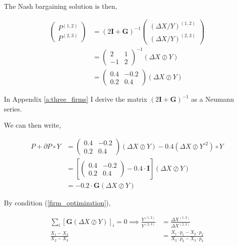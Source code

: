 \documentclass[american]{scrartcl}
\newcommand{\matr}[1]{\bm{#1}}
\begin{document}
The Nash bargaining solution is then,

\begin{equation*}
	\begin{split}
		\begin{pmatrix}
			P^{(1, 2)} \\
			P^{(2, 3)}
		\end{pmatrix} &= (2\matr{I} + \matr{G})^{-1} \begin{pmatrix}
			(\Delta X / Y)^{(1, 2)} \\
			(\Delta X / Y)^{(2, 3)}
		\end{pmatrix} \\
		&= \begin{pmatrix}
			2  & 1 \\
			-1 & 2
		\end{pmatrix}^{-1} (\Delta X \oslash Y)\\
		&= \begin{pmatrix}
			0.4 & -0.2 \\
			0.2 & 0.4
		\end{pmatrix} (\Delta X \oslash Y)
	\end{split}
\end{equation*}

In Appendix \ref{a:three_firms} I derive the matrix $(2 \matr{I} + \matr{G})^{-1}$ as a Neumann series.

We can then write,

\begin{equation}
	\begin{split}
		P + \partial P \circ Y &= \begin{pmatrix}
			0.4 & -0.2 \\
			0.2 & 0.4
		\end{pmatrix} (\Delta X \oslash Y) - 0.4 (\Delta X \oslash Y^{\circ 2}) \circ Y \\
		&=  \left[ \begin{pmatrix}
				0.4 & -0.2 \\
				0.2 & 0.4
			\end{pmatrix}- 0.4 \cdot \matr{I} \right] (\Delta X \oslash Y) \\
		&= - 0.2 \cdot  \matr{G} (\Delta X \oslash Y)
	\end{split}
\end{equation}

By condition (\ref{firm_optimization}),

\begin{equation}
	\begin{split}
		\sum_{i} [\matr{G} (\Delta X \oslash Y)]_i = 0 \implies
		\frac{Y^{(1, 2)}}{Y^{(2, 3)}} &= \frac{\Delta X^{(1, 2)}}{\Delta X^{(2, 3)}} \\
		\frac{X_1 - X_2}{X_2 - X_3} &= \frac{X_1 \cdot p_1 - X_2 \cdot p_2}{X_2 \cdot p_2 - X_3 \cdot p_3}
	\end{split}
\end{equation}
\end{document}
